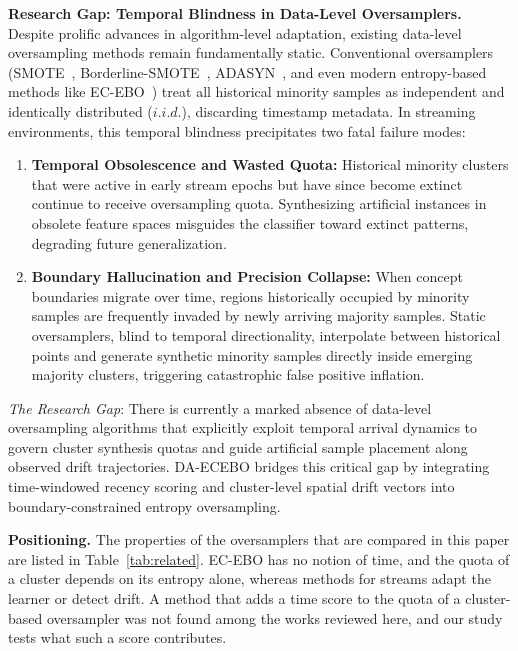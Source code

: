 \documentclass[preprint,10pt]{elsarticle}
\begin{document}
\textbf{Research Gap: Temporal Blindness in Data-Level Oversamplers.} \quad Despite prolific advances in algorithm-level adaptation, existing data-level oversampling methods remain fundamentally static. Conventional oversamplers (SMOTE~\cite{chawla2002}, Borderline-SMOTE~\cite{han2005}, ADASYN~\cite{he2008}, and even modern entropy-based methods like EC-EBO~\cite{tao2026}) treat all historical minority samples as independent and identically distributed ($i.i.d.$), discarding timestamp metadata. In streaming environments, this temporal blindness precipitates two fatal failure modes:
\begin{enumerate}[leftmargin=1.5em,label=(\arabic*)]
\item \textbf{Temporal Obsolescence and Wasted Quota:} Historical minority clusters that were active in early stream epochs but have since become extinct continue to receive oversampling quota. Synthesizing artificial instances in obsolete feature spaces misguides the classifier toward extinct patterns, degrading future generalization.
\item \textbf{Boundary Hallucination and Precision Collapse:} When concept boundaries migrate over time, regions historically occupied by minority samples are frequently invaded by newly arriving majority samples. Static oversamplers, blind to temporal directionality, interpolate between historical points and generate synthetic minority samples directly inside emerging majority clusters, triggering catastrophic false positive inflation.
\end{enumerate}
\emph{The Research Gap}: There is currently a marked absence of data-level oversampling algorithms that explicitly exploit temporal arrival dynamics to govern cluster synthesis quotas and guide artificial sample placement along observed drift trajectories. DA-ECEBO bridges this critical gap by integrating time-windowed recency scoring and cluster-level spatial drift vectors into boundary-constrained entropy oversampling.

\textbf{Positioning.} \quad The properties of the oversamplers that are compared in this paper are listed in Table~\ref{tab:related}. EC-EBO has no notion of time, and the quota of a cluster depends on its entropy alone, whereas methods for streams adapt the learner or detect drift. A method that adds a time score to the quota of a cluster-based oversampler was not found among the works reviewed here, and our study tests what such a score contributes.
\end{document}
